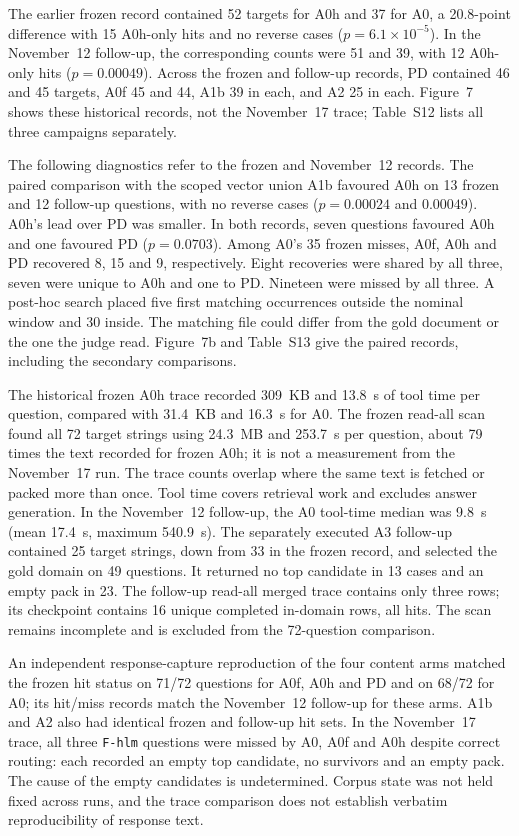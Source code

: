 The earlier frozen record contained 52 targets for A0h and 37 for A0,
a 20.8-point difference with 15 A0h-only hits and no reverse cases
($p=6.1\times10^{-5}$). In the November~12 follow-up, the corresponding
counts were 51 and 39, with 12 A0h-only hits ($p=0.00049$). Across the
frozen and follow-up records, PD contained 46 and 45 targets, A0f 45
and 44, A1b 39 in each, and A2 25 in each. Figure~7 shows
these historical records, not the November~17 trace; Table~S12 lists all
three campaigns separately.

The following diagnostics refer to the frozen and November~12 records.
The paired comparison with the scoped vector union A1b favoured A0h on
13 frozen and 12 follow-up questions, with no reverse cases
($p=0.00024$ and $0.00049$). A0h's lead over PD was smaller. In both
records, seven questions favoured A0h and one favoured PD
($p=0.0703$). Among A0's 35 frozen misses, A0f, A0h and PD recovered
8, 15 and 9, respectively. Eight recoveries were shared by all three,
seven were unique to A0h and one to PD. Nineteen were missed by all three.
A post-hoc search placed five first matching occurrences outside the
nominal window and 30 inside. The matching file could differ from the gold
document or the one the judge read. Figure~7b and Table~S13
give the paired records, including the secondary comparisons.

The historical frozen A0h trace recorded 309~KB and 13.8~s of tool time per question, compared with
31.4~KB and 16.3~s for A0. The frozen read-all scan found all 72 target strings
using 24.3~MB and 253.7~s per question, about 79 times the text recorded
for frozen A0h; it is not a measurement from the November~17 run. The trace
counts overlap where the same text is fetched or packed more than once. Tool
time covers retrieval work and excludes answer generation. In the November~12
follow-up, the A0 tool-time median was 9.8~s (mean 17.4~s, maximum 540.9~s).
The separately executed A3 follow-up contained 25 target strings, down from
33 in the frozen record, and selected the gold domain on 49 questions. It
returned no top candidate in 13 cases and an empty pack in 23. The follow-up
read-all merged trace contains only three rows; its checkpoint contains 16
unique completed in-domain rows, all hits. The scan remains incomplete and
is excluded from the 72-question comparison.

An independent response-capture reproduction of the four content arms
matched the frozen hit status on 71/72 questions for A0f, A0h and PD and
on 68/72 for A0; its hit/miss records match the November~12 follow-up for
these arms. A1b and A2 also had identical frozen and follow-up hit sets.
In the November~17 trace, all three \texttt{F-hlm} questions were missed
by A0, A0f and A0h despite correct routing: each recorded an empty top
candidate, no survivors and an empty pack. The cause of the empty candidates
is undetermined. Corpus state was not held fixed across runs, and the trace
comparison does not establish verbatim reproducibility of response text.

